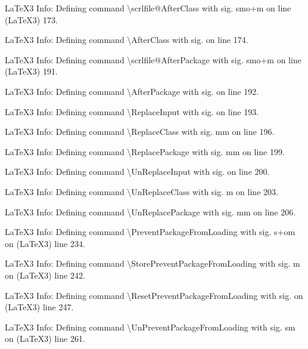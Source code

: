 \documentclass[
  letterpaper,
  DIV=11,
  numbers=noendperiod]{scrartcl}
\newenvironment{Shaded}{\begin{snugshade}}{\end{snugshade}}
\newcommand{\NormalTok}[1]{\textcolor[rgb]{0.00,0.23,0.31}{#1}}
\begin{document}
\begin{Shaded}
\begin{Highlighting}[]
\NormalTok{LaTeX3 Info: Defining command \textbackslash{}scrlfile@AfterClass with sig. \textquotesingle{}smo+m\textquotesingle{} on line}
\NormalTok{(LaTeX3)     173.}


\NormalTok{LaTeX3 Info: Defining command \textbackslash{}AfterClass with sig. \textquotesingle{}\textquotesingle{} on line 174.}


\NormalTok{LaTeX3 Info: Defining command \textbackslash{}scrlfile@AfterPackage with sig. \textquotesingle{}smo+m\textquotesingle{} on line}
\NormalTok{(LaTeX3)     191.}


\NormalTok{LaTeX3 Info: Defining command \textbackslash{}AfterPackage with sig. \textquotesingle{}\textquotesingle{} on line 192.}


\NormalTok{LaTeX3 Info: Defining command \textbackslash{}ReplaceInput with sig. \textquotesingle{}\textquotesingle{} on line 193.}


\NormalTok{LaTeX3 Info: Defining command \textbackslash{}ReplaceClass with sig. \textquotesingle{}mm\textquotesingle{} on line 196.}


\NormalTok{LaTeX3 Info: Defining command \textbackslash{}ReplacePackage with sig. \textquotesingle{}mm\textquotesingle{} on line 199.}


\NormalTok{LaTeX3 Info: Defining command \textbackslash{}UnReplaceInput with sig. \textquotesingle{}\textquotesingle{} on line 200.}


\NormalTok{LaTeX3 Info: Defining command \textbackslash{}UnReplaceClass with sig. \textquotesingle{}m\textquotesingle{} on line 203.}


\NormalTok{LaTeX3 Info: Defining command \textbackslash{}UnReplacePackage with sig. \textquotesingle{}mm\textquotesingle{} on line 206.}


\NormalTok{LaTeX3 Info: Defining command \textbackslash{}PreventPackageFromLoading with sig. \textquotesingle{}s+om\textquotesingle{} on}
\NormalTok{(LaTeX3)     line 234.}


\NormalTok{LaTeX3 Info: Defining command \textbackslash{}StorePreventPackageFromLoading with sig. \textquotesingle{}m\textquotesingle{} on}
\NormalTok{(LaTeX3)     line 242.}


\NormalTok{LaTeX3 Info: Defining command \textbackslash{}ResetPreventPackageFromLoading with sig. \textquotesingle{}\textquotesingle{} on}
\NormalTok{(LaTeX3)     line 247.}


\NormalTok{LaTeX3 Info: Defining command \textbackslash{}UnPreventPackageFromLoading with sig. \textquotesingle{}sm\textquotesingle{} on}
\NormalTok{(LaTeX3)     line 261.}



\end{Highlighting}
\end{Shaded}
\end{document}
